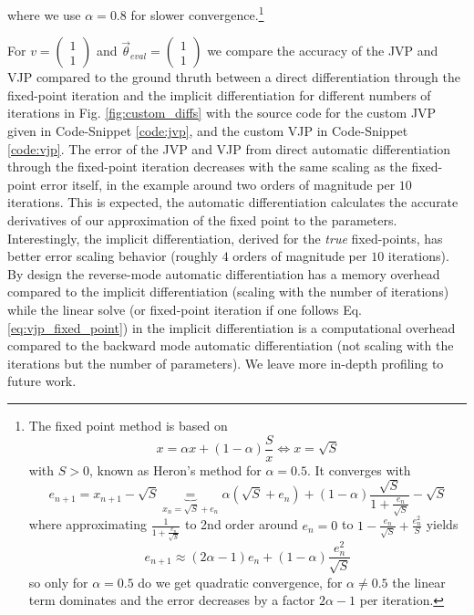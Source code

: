 where we use $\alpha = 0.8$ for slower convergence.\footnote{
The fixed point method is based on
\begin{equation}
    x = \alpha x + (1-\alpha)\frac{S}{x} \iff x = \sqrt{S}
\end{equation}
with $S>0$, known as Heron's method for $\alpha = 0.5$.
It converges with
\begin{equation}
    e_{n+1} = x_{n+1} - \sqrt{S} \underbrace{=}_{x_n = \sqrt{S} + e_n} \alpha (\sqrt{S} + e_n) + (1-\alpha)\frac{\sqrt{S}}{1 + \frac{e_n}{\sqrt{S}}} - \sqrt{S} 
\end{equation}
where approximating $\frac{1}{1 + \frac{e_n}{\sqrt{S}}}$ to 2nd order around $e_n = 0$ to $1 - \frac{e_n}{\sqrt{S}} + \frac{e_n^2}{S}$ yields
\begin{equation}
    e_{n+1} \approx (2\alpha-1) e_n + (1-\alpha)\frac{e_n^2}{\sqrt{S}}
\end{equation}
so only for $\alpha = 0.5$ do we get quadratic convergence, for $\alpha \ne 0.5$ the linear
term dominates and the error decreases by a factor $2\alpha - 1$ per iteration.}

For $v = \begin{pmatrix} 1 \\ 1 \end{pmatrix}$ and $\vec{\theta}_{eval} = \begin{pmatrix} 1 \\ 1 \end{pmatrix}$
we compare the accuracy of the JVP and VJP compared to the ground thruth between a direct differentiation
through the fixed-point iteration and the implicit differentiation for different numbers of iterations in
Fig. \ref{fig:custom_diffs} with the source code for the custom JVP given in Code-Snippet \ref{code:jvp},
and the custom VJP in Code-Snippet \ref{code:vjp}. The error of the JVP and VJP from direct
automatic differentiation through the fixed-point iteration decreases with the same scaling
as the fixed-point error itself, in the example around two orders of magnitude per $10$ iterations.
This is expected, the automatic differentiation calculates the accurate derivatives of our approximation
of the fixed point to the parameters. Interestingly, the implicit differentiation, derived for
the \textit{true} fixed-points, has better error scaling behavior (roughly $4$ orders of
magnitude per $10$ iterations). By design the reverse-mode automatic differentiation
has a memory overhead compared to the implicit differentiation (scaling with the number of iterations)
while the linear solve (or fixed-point iteration if one follows Eq. \ref{eq:vjp_fixed_point}) 
in the implicit differentiation is a computational overhead compared to the backward mode automatic
differentiation (not scaling with the iterations but the number of parameters). We leave
more in-depth profiling to future work.

